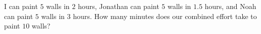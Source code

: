 I can paint $5$ walls in $2$ hours, Jonathan can paint $5$ walls in $1.5$ hours, and Noah can paint $5$ walls in $3$ hours. How many minutes does our combined effort take to paint $10$ walls?
